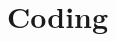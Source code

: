 \documentclass[a4paper,10pt]{article}
\begin{document}
\section{Coding}


%
%
%
%
%
%
\end{document}
